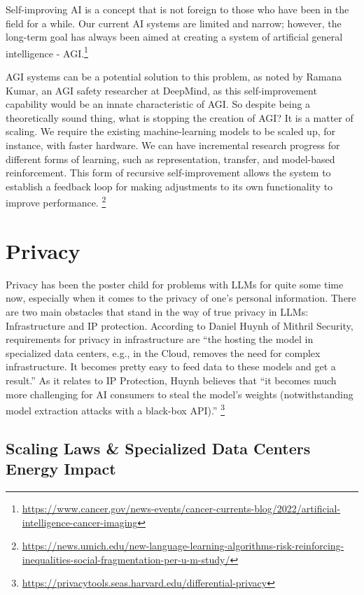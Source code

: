 \documentclass[
]{book}
\begin{document}
Self-improving AI is a concept that is not foreign to those who have been in the field for a while. Our current AI systems are limited and narrow; however, the long-term goal has always been aimed at creating a system of artificial general intelligence - AGI.\footnote{\url{https://www.cancer.gov/news-events/cancer-currents-blog/2022/artificial-intelligence-cancer-imaging}}

AGI systems can be a potential solution to this problem, as noted by Ramana Kumar, an AGI safety researcher at DeepMind, as this self-improvement capability would be an innate characteristic of AGI. So despite being a theoretically sound thing, what is stopping the creation of AGI? It is a matter of scaling.
We require the existing machine-learning models to be scaled up, for instance, with faster hardware. We can have incremental research progress for different forms of learning, such as representation, transfer, and model-based reinforcement. This form of recursive self-improvement allows the system to establish a feedback loop for making adjustments to its own functionality to improve performance. \footnote{\url{https://news.umich.edu/new-language-learning-algorithms-risk-reinforcing-inequalities-social-fragmentation-per-u-m-study/}}

\hypertarget{privacy}{%
\chapter{Privacy}\label{privacy}}

Privacy has been the poster child for problems with LLMs for quite some time now, especially when it comes to the privacy of one's personal information. There are two main obstacles that stand in the way of true privacy in LLMs: Infrastructure and IP protection. According to Daniel Huynh of Mithril Security, requirements for privacy in infrastructure are ``the hosting the model in specialized data centers, e.g., in the Cloud, removes the need for complex infrastructure. It becomes pretty easy to feed data to these models and get a result.'' As it relates to IP Protection, Huynh believes that ``it becomes much more challenging for AI consumers to steal the model's weights (notwithstanding model extraction attacks with a black-box API).'' \footnote{\url{https://privacytools.seas.harvard.edu/differential-privacy}}

\hypertarget{scaling-laws-specialized-data-centers-energy-impact}{%
\section{Scaling Laws \& Specialized Data Centers Energy Impact}\label{scaling-laws-specialized-data-centers-energy-impact}}
\end{document}
